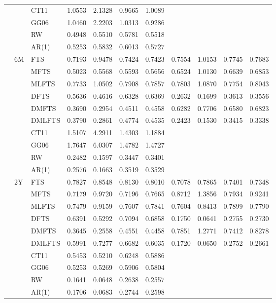 \documentclass[12pt,a4paper]{article}
\begin{document}
\begin{center}
\begin{small}
\begin{longtable}{@{}lllcccccccc@{}}
& & CT11 & 1.0553 & 2.1328 & 0.9665 & 1.0089 \\
& & GG06 & 1.0460 & 2.2203 & 1.0313 & 0.9286 \\
& & RW & 0.4948 & 0.5510 & 0.5781 & 0.5518  \\
& & AR(1) & 0.5253 & 0.5832 & 0.6013 & 0.5727 \\
  \cmidrule{2-11}
   & 6M & FTS & 0.7193 & 0.9478 & 0.7424 & 0.7423 & 0.7554 & 1.0153 & 0.7745 & 0.7683 \\
& & MFTS & 0.5023 & 0.5568 & 0.5593 & 0.5656 & 0.6524 & 1.0130 & 0.6639 & 0.6853 \\
& & MLFTS & 0.7733 & 1.0502 & 0.7908 & 0.7857 & 0.7803 & 1.0870 & 0.7754 & 0.8043  \\
& & DFTS & 0.5636 & 0.4616 & 0.6328 & 0.6369 & 0.2632 & 0.1699 & 0.3613 & 0.3556 \\
& & DMFTS & 0.3690 & 0.2954 & 0.4511 & 0.4558 & 0.6282 & 0.7706 & 0.6580 & 0.6823 \\
& & DMLFTS & 0.3790 & 0.2861 & 0.4774 & 0.4535 & 0.2423 & 0.1530 & 0.3415 & 0.3338 \\
& & CT11 & 1.5107 & 4.2911 & 1.4303 & 1.1884 \\
& & GG06 & 1.7647 & 6.0307 & 1.4782 & 1.4727 \\
& & RW & 0.2482 & 0.1597 & 0.3447 & 0.3401 \\
& & AR(1) & 0.2576 & 0.1663 & 0.3519 & 0.3529 \\
  \cmidrule{2-11}
     & 2Y & FTS & 0.7827 & 0.8548 & 0.8130 & 0.8010 & 0.7078 & 0.7865 & 0.7401 & 0.7348 \\
& & MFTS & 0.7179 & 0.9720 & 0.7196 & 0.7665 & 0.8712 & 1.3856 & 0.7934 & 0.9241 \\
& & MLFTS & 0.7479 & 0.9159 & 0.7607 & 0.7841 & 0.7604 & 0.8413 & 0.7899 & 0.7790 \\
& & DFTS & 0.6391 & 0.5292 & 0.7094 & 0.6858 & 0.1750 & 0.0641 & 0.2755 & 0.2730 \\ 
& & DMFTS & 0.3645 & 0.2558 & 0.4551 & 0.4458 & 0.7851 & 1.2771 & 0.7412 & 0.8278 \\
& & DMLFTS & 0.5991 & 0.7277 & 0.6682 & 0.6035 & 0.1720 & 0.0650 & 0.2752 & 0.2661 \\
& & CT11 & 0.5453 & 0.5210 & 0.6248 & 0.5886 \\
& & GG06 & 0.5253 & 0.5269 & 0.5906 & 0.5804 \\
& & RW & 0.1641 & 0.0648 & 0.2638 & 0.2557 \\
& & AR(1) & 0.1706 & 0.0683 & 0.2744 & 0.2598 \\

\end{longtable}
\end{small}
\end{center}
\end{document}
